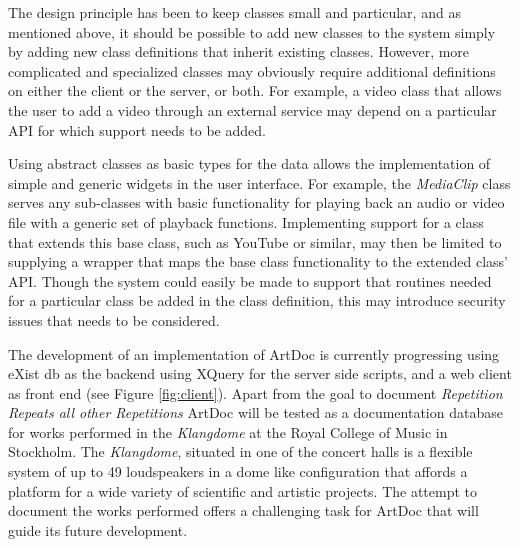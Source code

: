\documentclass[,a4paper]{llncs}
\begin{document}
\vspace{0.5cm}

The design principle has been to keep classes small and particular, and as mentioned above, it should be possible to add new classes to the system simply by adding new class definitions that inherit existing classes. However, more complicated and specialized classes may obviously require additional definitions on either the client or the server, or both. For example, a video class that allows the user to add a video through an external service may depend on a particular API for which support needs to be added. 

Using abstract classes as basic types for the data allows the implementation of simple and generic widgets in the user interface. For example, the \emph{MediaClip} class serves any sub-classes with basic functionality for playing back an audio or video file with a generic set of playback functions. Implementing support for a class that extends this base class, such as YouTube or similar, may then be limited to supplying a wrapper that maps the base class functionality to the extended class' API. Though the system could easily be made to support that routines needed for a particular class be added in the class definition, this may introduce security issues that needs to be considered.

The development of an implementation of ArtDoc is currently progressing using eXist db \cite{exist} as the backend using XQuery for the server side scripts, and a web client as front end (see Figure \ref{fig:client}). Apart from the goal to document \emph{Repetition Repeats all other Repetitions} ArtDoc will be tested as a documentation database for works performed in the \emph{Klangdome} at the Royal College of Music in Stockholm. The \emph{Klangdome}, situated in one of the concert halls is a flexible system of up to 49 loudspeakers in a dome like configuration that affords a platform for a wide variety of scientific and artistic projects. The attempt to document the works performed offers a challenging task for ArtDoc that will guide its future development.
\end{document}
